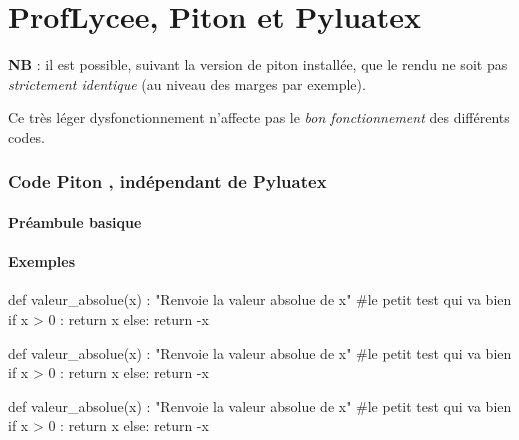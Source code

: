 \documentclass[french,a4paper,10pt]{article}
\begin{document}
\part*{ProfLycee, Piton et Pyluatex}

\textbf{NB} : il est possible, suivant la version de \textsf{piton} installée, que le rendu ne soit pas \textit{strictement identique} (au niveau des marges par exemple).

Ce très léger dysfonctionnement n'affecte pas le \textit{bon fonctionnement} des différents codes.

\section{Code \og Piton \fg{}, indépendant de Pyluatex}

\subsection{Préambule basique}

{\small {}}

\subsection{Exemples}

{\small \begin{codehigh}
\begin{CodePiton}{}
def valeur_absolue(x) :
    "Renvoie la valeur absolue de x"
    #le petit test qui va bien
    if x > 0 :
        return x
    else:
    return -x
\end{CodePiton}
\end{codehigh}}

\begin{CodePiton}{}
def valeur_absolue(x) :
	"Renvoie la valeur absolue de x"
	#le petit test qui va bien
	if x > 0 :
		return x
	else:
		return -x
\end{CodePiton}

{\small \begin{codehigh}
\begin{CodePiton}[Largeur=10cm,CouleurNombres=olive]{}
def valeur_absolue(x) :
    "Renvoie la valeur absolue de x"
    #le petit test qui va bien
    if x > 0 :
        return x
    else:
    return -x
\end{CodePiton}
\end{codehigh}}
\end{document}
